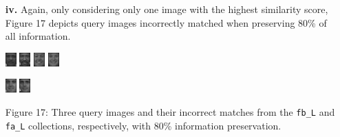 \documentclass[ 12pt ]{article}
\begin{document}
\begin{enumerate}
\begin{enumerate}
            \item[\textbf{iv.}] Again, only considering only one image with the highest similarity score, Figure 17 depicts query images incorrectly matched when preserving 80\% of all
                information.
                \newpage
                \begin{center}
                    \includegraphics[scale=5]{f_l_images/AnyConv.com__00183_940128_fb}
                    \includegraphics[scale=5]{f_l_images/AnyConv.com__00716_941205_fa}
                    \includegraphics[scale=5]{f_l_images/AnyConv.com__00451_940422_fb}
                    \includegraphics[scale=5]{f_l_images/AnyConv.com__00346_940422_fa}
                \end{center}
                \begin{center}
                    \includegraphics[scale=5]{f_l_images/AnyConv.com__00594_941031_fb}
                    \includegraphics[scale=5]{f_l_images/AnyConv.com__00383_941031_fa}
                \end{center}
                \begin{center}
                    \scriptsize
                    Figure 17: Three query images and their incorrect matches from the \verb|fb_L| and \verb|fa_L| collections, respectively, with 80\% information
                    preservation.
                \end{center}


\end{enumerate}
\end{enumerate}
\end{document}
